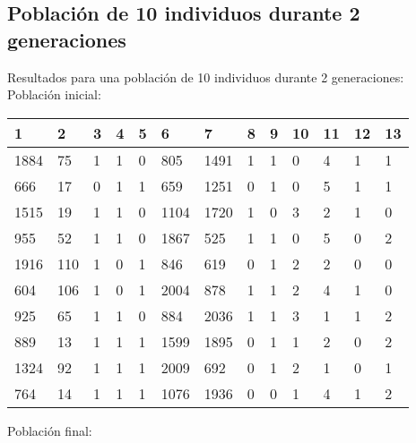 \subsection{Población de 10 individuos durante 2 generaciones}
Resultados para una población de 10 individuos durante 2 generaciones:
Población inicial:
\begin{table}[H]
\begin{tabular}{|l|l|l|l|l|l|l|l|l|l|l|l|l|}
\hline
\textbf{1} & \textbf{2} & \textbf{3} & \textbf{4} & \textbf{5} & \textbf{6} & \textbf{7} & \textbf{8} & \textbf{9} & \textbf{10} & \textbf{11} & \textbf{12} & \textbf{13} \\ \hline
1884  &  75  &  1  &  1  &  0  &  805  &  1491  &  1  &  1  &  0  &  {\color[HTML]{FE0000}4}  &  1  &  1 \\ \hline
666  &  17  &  0  &  1  &  1  &  659  &  1251  &  0  &  1  &  0  &  {\color[HTML]{FE0000}5}  &  1  &  1 \\ \hline
1515  &  19  &  1  &  1  &  0  &  1104  &  1720  &  1  &  0  &  3  &  2  &  1  &  0 \\ \hline
955  &  52  &  1  &  1  &  0  &  1867  &  525  &  1  &  1  &  0  &  {\color[HTML]{FE0000}5}  &  0  &  2 \\ \hline
1916  &  110  &  1  &  0  &  1  &  846  &  619  &  0  &  1  &  2  &  2  &  0  &  0 \\ \hline
604  &  106  &  1  &  0  &  1  &  2004  &  878  &  1  &  1  &  2  &  {\color[HTML]{FE0000}4}  &  1  &  0 \\ \hline
925  &  65  &  1  &  1  &  0  &  884  &  2036  &  1  &  1  &  3  &  1  &  1  &  2 \\ \hline
889  &  13  &  1  &  1  &  1  &  1599  &  1895  &  0  &  1  &  1  &  2  &  0  &  2 \\ \hline
1324  &  92  &  1  &  1  &  1  &  2009  &  692  &  0  &  1  &  2  &  1  &  0  &  1 \\ \hline
764  &  14  &  1  &  1  &  1  &  1076  &  1936  &  0  &  0  &  1  &  {\color[HTML]{FE0000}4}  &  1  &  2 \\ \hline
\end{tabular}
\end{table}
Población final:
